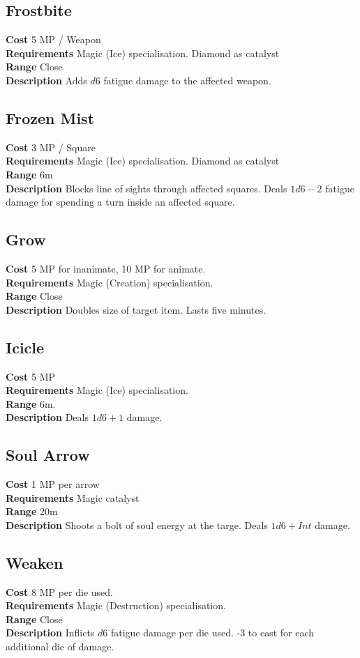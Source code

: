 \subsection{Frostbite}
\textbf{Cost} 5 MP / Weapon\\
\textbf{Requirements} Magic (Ice) specialisation.
Diamond as catalyst\\
\textbf{Range} Close\\
\textbf{Description} Adds $d6$ fatigue damage to the affected weapon.

\subsection{Frozen Mist}
\textbf{Cost} 3 MP / Square\\
\textbf{Requirements} Magic (Ice) specialisation. 
Diamond as catalyst\\
\textbf{Range} 6m\\
\textbf{Description} Blocks line of sights through affected squares. 
Deals $1d6-2$ fatigue damage for spending a turn inside an affected square.

\subsection{Grow}
\textbf{Cost} 5 MP for inanimate, 10 MP for animate.\\
\textbf{Requirements} Magic (Creation) specialisation. \\
\textbf{Range} Close\\
\textbf{Description} Doubles size of target item. 
Lasts five minutes.

\subsection{Icicle}
\textbf{Cost} 5 MP\\
\textbf{Requirements} Magic (Ice) specialisation. \\
\textbf{Range} 6m.\\
\textbf{Description} Deals $1d6+1$ damage.

\subsection{Soul Arrow}
\textbf{Cost} 1 MP per arrow\\
\textbf{Requirements} Magic catalyst\\
\textbf{Range} 20m\\
\textbf{Description} Shoots a bolt of soul energy at the targe.
Deals $1d6 + Int$ damage.

\subsection{Weaken}
\textbf{Cost} 8 MP per die used.\\
\textbf{Requirements} Magic (Destruction) specialisation.\\
\textbf{Range} Close\\
\textbf{Description} Inflicts $d6$ fatigue damage per die used. 
-3 to cast for each additional die of damage.